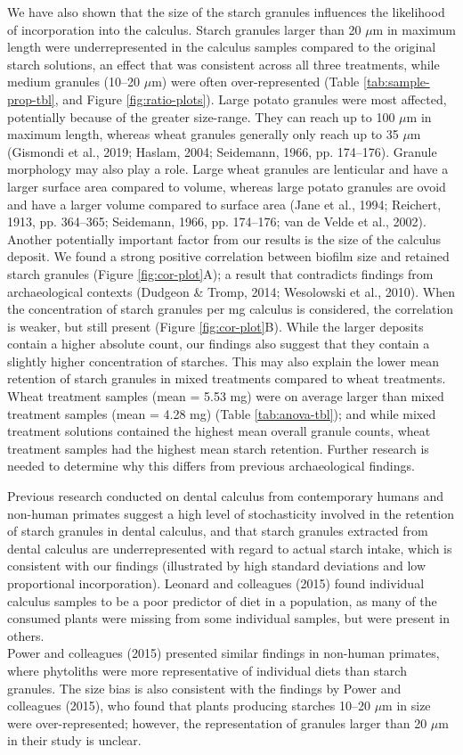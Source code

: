 \documentclass[
]{article}
\begin{document}
We have also shown that the size of the starch granules influences the likelihood
of incorporation into the calculus. Starch granules larger than 20 \(\mu\)m in
maximum length were underrepresented in the calculus samples compared to the original
starch solutions, an effect that was consistent across all three treatments,
while medium granules (10--20 \(\mu\)m) were often over-represented
(Table \ref{tab:sample-prop-tbl},
and
Figure \ref{fig:ratio-plots}).
Large potato granules were most affected, potentially because of the greater
size-range. They can reach up to 100 \(\mu\)m in maximum length, whereas wheat
granules generally only reach up to 35 \(\mu\)m
(Gismondi et al., 2019; Haslam, 2004; Seidemann, 1966, pp. 174--176).
Granule morphology may also play a role. Large wheat granules
are lenticular and have a larger surface area compared
to volume, whereas large potato granules are ovoid and have a larger volume
compared to surface area
(Jane et al., 1994; Reichert, 1913, pp. 364--365; Seidemann, 1966, pp. 174--176; van de Velde et al., 2002).
Another potentially important factor
from our results is the size of the calculus deposit. We found a
strong positive correlation between biofilm size and retained
starch granules (Figure \ref{fig:cor-plot}A);
a result that contradicts findings from archaeological contexts
(Dudgeon \& Tromp, 2014; Wesolowski et al., 2010).
When the concentration of starch granules
per mg calculus is considered, the correlation is weaker, but still present
(Figure \ref{fig:cor-plot}B).
While the larger deposits contain a higher absolute count, our findings also suggest
that they contain a slightly higher concentration of starches. This may also explain
the lower mean retention of starch granules in mixed treatments compared to
wheat treatments. Wheat treatment samples (mean = 5.53 mg) were on average larger than mixed treatment samples (mean = 4.28 mg) (Table \ref{tab:anova-tbl}); and while mixed treatment solutions contained the highest mean overall
granule counts, wheat treatment samples had the highest mean starch retention.
Further research is needed to determine why this differs from previous archaeological
findings.

Previous research conducted on dental calculus from contemporary humans and non-human
primates suggest a high level of stochasticity involved in the retention of
starch granules in dental calculus, and that starch granules extracted from dental
calculus are underrepresented with regard
to actual starch intake, which is consistent with our findings (illustrated by high
standard deviations and low proportional incorporation).
Leonard and colleagues (2015) found individual
calculus samples to be a poor predictor of diet in a population, as many of the
consumed plants were missing from some individual samples, but were present in others.\\
Power and colleagues (2015)
presented similar findings in non-human primates, where phytoliths were more
representative of individual diets than starch granules.
The size bias is also consistent with the findings by Power and colleagues
(2015),
who found that plants producing starches 10--20 \(\mu\)m in
size were over-represented; however, the representation of granules larger than
20 \(\mu\)m in their study is unclear.
\end{document}
